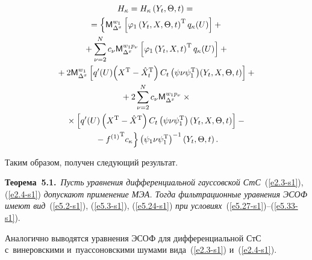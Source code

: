 \begin{multicols}{2}
\noindent
\begin{multline}
H_\kappa= H_\kappa\left(Y_t,\Theta,t\right) ={}\\
{}=
\left\{ {\sf M}_{\Delta^x}^{w_1} \left[\varphi_1\left(Y_t, X, \Theta,t\right)^{\mathrm{T}} 
q_\kappa (U) \right] +{}\right.\\
{}+\sum\limits_{\nu=2}^N c_\nu {\sf M}_{\Delta^x}^{w_1p_\nu}\left[
\varphi_1\left(Y_t, X, t\right)^{\mathrm{T}} q_\kappa (U)\right]  +{}\\
{}+2{\sf M}_{\Delta^x}^{w_1}\left[ q'(U) \!\left(X^{\mathrm{T}}-{\hat X}_t^{\mathrm{T}}\right) 
C_t \left(\psi\nu\psi_1^{\mathrm{T}}\right) \!\left(Y_t,X,\Theta,t\right) \right] +{}\\
{}+2\sum\limits_{\nu=2}^N c_\nu {\sf M}_{\Delta^x}^{w_1p_\nu}\times{}\\
{}\times \left[ q' (U) 
\left(X^{\mathrm{T}}-{\hat X}^{\mathrm{T}}\right) 
C_t \left(\psi\nu\psi_1^{\mathrm{T}}\right) \left(Y_t,X,\Theta,t\right)\right]-{}\\
\left. {}- {f^{(1)}}^{\mathrm{T}} c_\kappa\right\} 
\left(\psi_1\nu\psi_1^{\mathrm{T}}\right)^{-1} \left(Y_t,\Theta,t\right).
\label{e5.33-s1}
\end{multline}

Таким образом, получен следующий результат.

\smallskip

\noindent
\textbf{Теорема~5.1.}\ \textit{Пусть уравнения
дифференциальной гауссовской СтС}~(\ref{e2.3-s1}), (\ref{e2.4-s1}) 
\textit{допускают применение МЭА.
 Тогда фильтрационные уравнения ЭСОФ 
 имеют  вид}~(\ref{e5.2-s1}), (\ref{e5.3-s1}), (\ref{e5.24-s1})
\textit{при условиях}~(\ref{e5.27-s1})--(\ref{e5.33-s1}).

\smallskip

Аналогично выводятся уравнения ЭСОФ для дифференциальной СтС 
с~винеровскими и~пуассоновскими шумами вида~(\ref{e2.3-s1}) и~(\ref{e2.4-s1}).


\end{multicols}
